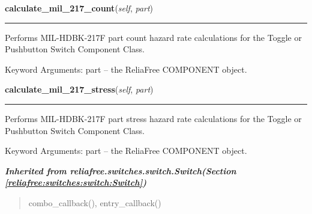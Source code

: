 \hspace{.8\funcindent}\begin{boxedminipage}{\funcwidth}

    \raggedright \textbf{calculate\_mil\_217\_count}(\textit{self}, \textit{part})

    \vspace{-1.5ex}

    \rule{\textwidth}{0.5\fboxrule}
\setlength{\parskip}{2ex}
    Performs MIL-HDBK-217F part count hazard rate calculations for the 
    Toggle or Pushbutton Switch Component Class.

    Keyword Arguments: part -- the ReliaFree COMPONENT object.

\setlength{\parskip}{1ex}
    \end{boxedminipage}

    \label{reliafree:switches:toggle:Toggle:calculate_mil_217_stress}

    \vspace{0.5ex}

\hspace{.8\funcindent}\begin{boxedminipage}{\funcwidth}

    \raggedright \textbf{calculate\_mil\_217\_stress}(\textit{self}, \textit{part})

    \vspace{-1.5ex}

    \rule{\textwidth}{0.5\fboxrule}
\setlength{\parskip}{2ex}
    Performs MIL-HDBK-217F part stress hazard rate calculations for the 
    Toggle or Pushbutton Switch Component Class.

    Keyword Arguments: part -- the ReliaFree COMPONENT object.

\setlength{\parskip}{1ex}
    \end{boxedminipage}


\large{\textbf{\textit{Inherited from reliafree.switches.switch.Switch\textit{(Section \ref{reliafree:switches:switch:Switch})}}}}

\begin{quote}
combo\_callback(), entry\_callback()
\end{quote}
